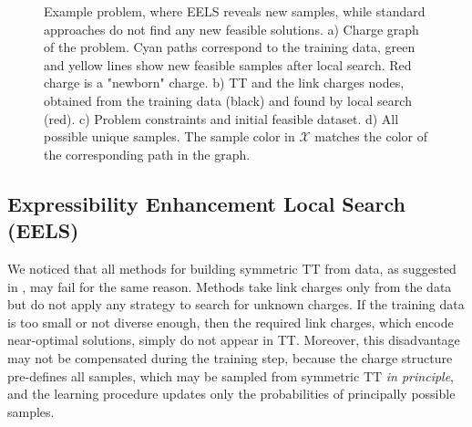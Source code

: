 \documentclass{article}
\theoremstyle{plain}
\theoremstyle{definition}
\theoremstyle{remark}
\begin{document}
\begin{figure}[h]
\caption{Example problem, where EELS reveals new samples, while standard approaches do not find any new feasible solutions. a) Charge graph of the problem. Cyan paths correspond to the training data, green and yellow lines show new feasible samples after local search. Red charge is a "newborn" charge. b) TT and the link charges nodes, obtained from the training data (black) and found by local search (red). c) Problem constraints and initial feasible dataset. d) All possible unique samples. The sample color in $\mathcal{X}$ matches the color of the corresponding path in the graph.}
\label{fig:example_graph}
\end{figure}

\subsection{Expressibility Enhancement Local Search (EELS)}
\label{subsec:eels}
We noticed that all methods for building symmetric TT from data, as suggested in \cite{LopezPiqueres2023}, may fail for the same reason. Methods take link charges only from the data but do not apply any strategy to search for unknown charges. If the training data is too small or not diverse enough, then the required link charges, which encode near-optimal solutions, simply do not appear in TT. Moreover, this disadvantage may not be compensated during the training step, because the charge structure pre-defines all samples, which may be sampled from symmetric TT \textit{in principle}, and the learning procedure updates only the probabilities of principally possible samples.
\end{document}
